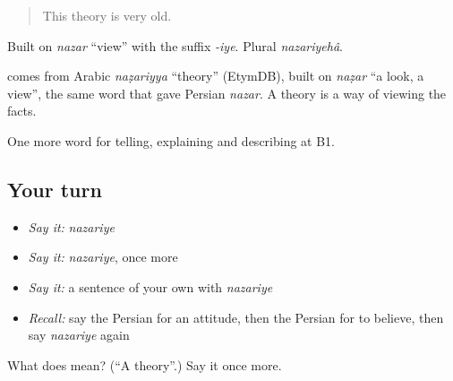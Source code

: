 \begin{quote}
This theory is very old.
\end{quote}

Built on \emph{nazar} \textquotedblleft{}view\textquotedblright{} with the suffix \emph{-iye}. Plural \emph{nazariyehâ}.

\begin{cousinweb}
\textbf{} comes from Arabic \emph{naẓariyya} \textquotedblleft{}theory\textquotedblright{} (EtymDB), built on \emph{naẓar} \textquotedblleft{}a look, a view\textquotedblright{}, the same word that gave Persian \emph{nazar}. A theory is a way of viewing the facts.
\end{cousinweb}

\begin{grammarlens}[title={What you've built}]
One more word for telling, explaining and describing at B1.
\end{grammarlens}

\subsection*{Your turn}
\begin{itemize}
\raggedright
  \item \emph{Say it:} \emph{nazariye}
  \item \emph{Say it:} \emph{nazariye}, once more
  \item \emph{Say it:} a sentence of your own with \emph{nazariye}
  \item \emph{Recall:} say the Persian for an attitude, then the Persian for to believe, then say \emph{nazariye} again
\end{itemize}

\begin{tcolorbox}[breakable,colback=teal!4,colframe=teal!35!black,title={Before you move on}]
What does  mean? (\textquotedblleft{}A theory\textquotedblright{}.) Say it once more.
\end{tcolorbox}
